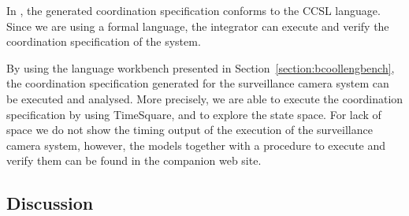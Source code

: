 	In \bcool, the generated coordination specification conforms to the CCSL language. Since we are using a formal language, the integrator can execute and verify the coordination specification of the system.
	
	By using the language workbench presented in Section~\ref{section:bcoollengbench}, the coordination specification generated for the surveillance camera system can be executed and analysed. More precisely, we are able to execute the coordination specification by using TimeSquare, and to explore the state space. For lack of space we do not show the timing output of the execution of the surveillance camera system, however, the models together with a procedure to execute and verify them can be found in the companion web site.
	
	\subsection{Discussion}